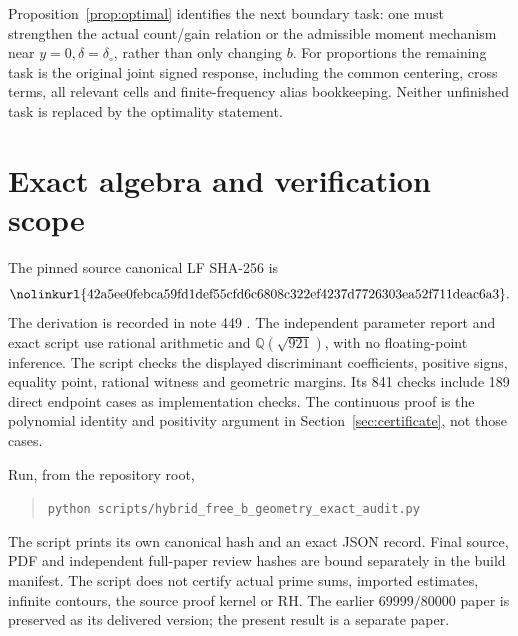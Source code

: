 \documentclass[11pt,a4paper]{article}
\theoremstyle{definition}
\newcommand{\src}[1]{\nolinkurl{#1}}
\begin{document}
Proposition~\ref{prop:optimal} identifies the next boundary task:
one must strengthen the actual count/gain relation or the
admissible moment mechanism near $y=0,\delta=\delta_\circ$,
rather than only changing $b$.
For proportions the remaining task is the original joint
signed response, including the common centering, cross terms,
all relevant cells and finite-frequency alias bookkeeping.
Neither unfinished task is replaced by the optimality statement.

\appendix
\section{Exact algebra and verification scope}
\label{app:verification}
The pinned source canonical LF SHA-256 is
\[
 \text{\src{42a5ee0febca59fd1def55cfd6c6808c322ef4237d7726303ea52f711deac6a3}}.
\]
The derivation is recorded in note 449 \cite{Note449}.
The independent parameter report and exact script \cite{FreeBAudit}
use rational arithmetic and $\mathbb Q(\sqrt{921})$, with no
floating-point inference. The script checks the displayed
discriminant coefficients, positive signs, equality point,
rational witness and geometric margins. Its 841 checks include
189 direct endpoint cases as implementation checks.
The continuous proof is the polynomial identity and positivity
argument in Section~\ref{sec:certificate}, not those cases.

Run, from the repository root,
\begin{quote}
\texttt{python}\ \src{scripts/hybrid_free_b_geometry_exact_audit.py}
\end{quote}
The script prints its own canonical hash and an exact JSON record.
Final source, PDF and independent full-paper review hashes are
bound separately in the build manifest. The script does not
certify actual prime sums, imported estimates, infinite contours,
the source proof kernel or RH.
The earlier $69999/80000$ paper is preserved as its delivered
version; the present result is a separate paper.
\end{document}
